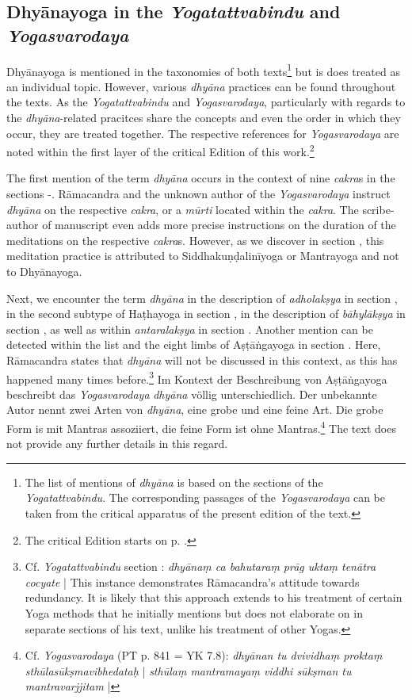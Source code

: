 \subsection{Dhyānayoga in the \textit{Yogatattvabindu} and \textit{Yogasvarodaya}}
\label{ramacandradhyana}
Dhyānayoga is mentioned in the taxonomies of both texts\footnote{The list of mentions of \textit{dhyāna} is based on the sections of the \textit{Yogatattvabindu}. The corresponding passages of the \textit{Yogasvarodaya} can be taken from the critical apparatus of the present edition of the text.} but is does treated as an individual topic. However, various \textit{dhyāna} practices can be found throughout the texts. As the \textit{Yogatattvabindu} and \textit{Yogasvarodaya}, particularly with regards to the \textit{dhyāna}-related pracitces share the concepts and even the order in which they occur, they are treated together. The respective references for \textit{Yogasvarodaya} are noted within the first layer of the critical Edition of this work.\footnote{The critical Edition starts on p. \pageref{intro}.} 

The first mention of the term \textit{dhyāna} occurs in the context of nine \textit{cakra}s in the sections -. Rāmacandra and the unknown author of the \textit{Yogasvarodaya} instruct \textit{dhyāna} on the respective \textit{cakra}, or a \textit{mūrti} located within the \textit{cakra}. The scribe-author of manuscript  even adds more precise instructions on the duration of the meditations on the respective \textit{cakra}s. However, as we discover in section , this meditation practice is attributed to Siddhakuṇḍalinīyoga or Mantrayoga and not to Dhyānayoga.

Next, we encounter the term \textit{dhyāna} in the description of \textit{adholakṣya} in section , in the second subtype of Haṭhayoga in section , in the description of \textit{bāhylākṣya} in section , as well as within \textit{antaralakṣya} in section . Another mention can be detected within the list and the eight limbs of Aṣṭāṅgayoga in section . Here, Rāmacandra states that \textit{dhyāna} will not be discussed in this context, as this has happened many times before.\footnote{Cf. \textit{Yogatattvabindu} section : \textit{dhyānaṃ ca bahutaraṃ prāg uktaṃ tenātra cocyate} | This instance demonstrates Rāmacandra's attitude towards redundancy. It is likely that this approach extends to his treatment of certain Yoga methods that he initially mentions but does not elaborate on in separate sections of his text, unlike his treatment of other Yogas.} Im Kontext der Beschreibung von Aṣṭāṅgayoga beschreibt das \emph{Yogasvarodaya} \textit{dhyāna} völlig unterschiedlich. Der unbekannte Autor nennt zwei Arten von \textit{dhyāna}, eine grobe und eine feine Art. Die grobe Form is mit Mantras assoziiert, die feine Form ist ohne Mantras.\footnote{Cf. \emph{Yogasvarodaya} (PT p. 841 = YK 7.8): \textit{dhyānan tu dvividhaṃ proktaṃ sthūlasūkṣmavibhedataḥ} | \textit{sthūlaṃ mantramayaṃ viddhi sūkṣman tu mantravarjjitam} |} The text does not provide any further details in this regard.

